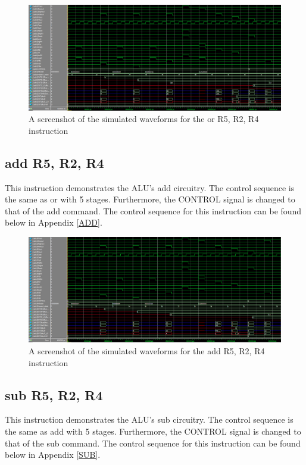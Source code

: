 \documentclass{article}
\begin{document}
    \begin{figure}[h!]
        \begin{center}
            \includegraphics[width=15cm]{OR_FINAL.png}
            \caption{A screenshot of the simulated waveforms for the or R5, R2, R4 instruction}
        \end{center}
    \end{figure}
     
    \subsection{add R5, R2, R4}
     This instruction demonstrates the ALU's add circuitry. The control sequence is the same as or with 5 stages. Furthermore, the CONTROL signal is changed to that of the add command. The control sequence for this instruction can be found below in Appendix \ref{ADD}.
     
    \begin{figure}[h!]
        \begin{center}
            \includegraphics[width=15cm]{ADD_FINAL.png}
            \caption{A screenshot of the simulated waveforms for the add R5, R2, R4 instruction}
        \end{center}
    \end{figure}
     
    \subsection{sub R5, R2, R4}
     This instruction demonstrates the ALU's sub circuitry. The control sequence is the same as add with 5 stages. Furthermore, the CONTROL signal is changed to that of the sub command. The control sequence for this instruction can be found below in Appendix \ref{SUB}.
     
\end{document}
